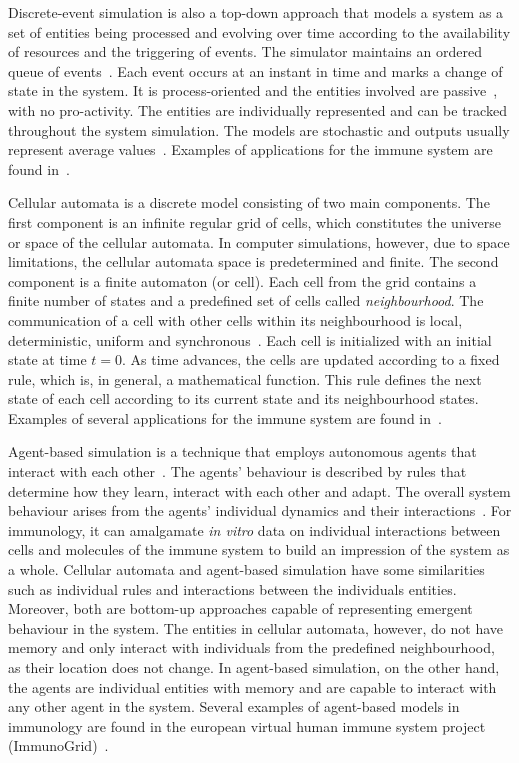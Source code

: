 \documentclass{llncs}
\begin{document}
Discrete-event simulation is also a top-down approach that models a system as a set of entities being processed and evolving over time according to the availability of resources and the triggering of events. The simulator maintains an ordered queue of events~\cite{Siebers:2007}. Each event occurs at an instant in time and marks a change of state in the system. It is process-oriented and the entities involved are passive~\cite{Robinson:2004}, with no pro-activity. The entities are individually represented and can be tracked throughout the system simulation. The models are stochastic and outputs usually represent average values~\cite{Robinson:2009}. Examples of applications for the immune system are found in~\cite{Look:1981,Zand:2004,Figge:2005}.

Cellular automata is a discrete model consisting of two main components. The first component is an infinite regular grid of cells, which constitutes the universe or space of the cellular automata. In computer simulations, however, due to space limitations, the cellular automata space is predetermined and finite. The second component is a finite automaton (or cell). Each cell from the grid contains a finite number of states and a predefined set of cells called {\it neighbourhood}. The communication of a cell with other cells within its neighbourhood is local, deterministic, uniform and synchronous~\cite{WOLFRAM:1983}. Each cell is initialized with an initial state at time $t = 0$. As time advances, the cells are updated according to a fixed rule, which is, in general, a mathematical function. This rule defines the next state of each cell according to its current state and its neighbourhood states. Examples of several applications for the immune system are found in~\cite{Nuno:2007}.

Agent-based simulation is a technique that employs autonomous agents that interact with each other~\cite{Macal:2005}. The agents' behaviour is described by rules that determine how they learn, interact with each other and adapt. The overall system behaviour arises from the agents' individual dynamics and their interactions~\cite{Siebers:2007}. For immunology, it can amalgamate {\it in vitro} data on individual interactions between cells and molecules of the immune system to build an impression of the system as a whole. Cellular automata and agent-based simulation have some similarities such as individual rules and interactions between the individuals entities. Moreover, both are bottom-up approaches capable of representing emergent behaviour in the system. The entities in cellular automata, however, do not have memory and only interact with individuals from the predefined neighbourhood, as their location does not change. In agent-based simulation, on the other hand, the agents are individual entities with memory and are capable to interact with any other agent in the system. Several examples of agent-based models in immunology are found in the european virtual human immune system project (ImmunoGrid)~\cite{ImmunoGrid}.
\end{document}
